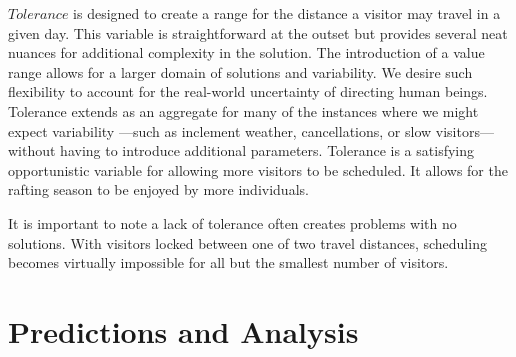 \documentclass[11pt]{article} %
\begin{document}
$Tolerance$ is designed to create a
range for the distance a  visitor may travel in a given day.  This variable
is straightforward at the outset but provides several neat nuances for additional
complexity in the solution.  The introduction of a value range allows
for a larger domain of solutions and variability.  We desire such flexibility
to account for the real-world uncertainty of
directing human beings.  Tolerance extends as an
aggregate for many of the instances where we might expect variability
---such as inclement weather, cancellations, or slow  visitors---
without having to introduce additional parameters.  Tolerance is a
satisfying opportunistic variable for allowing more visitors to be
scheduled.  It allows for the rafting season to be enjoyed by more individuals.

It is important to note a lack of tolerance often creates
problems with no solutions. With visitors locked between one of two
travel distances, scheduling becomes virtually impossible for all but the
smallest number of visitors.



\section{Predictions and Analysis}
\end{document}
